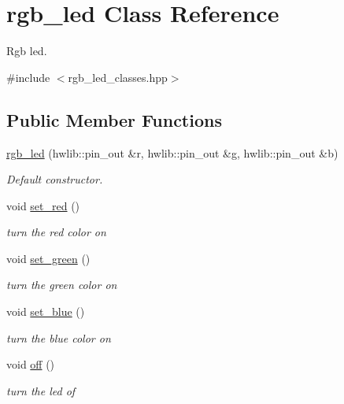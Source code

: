 \hypertarget{classrgb__led}{}\section{rgb\+\_\+led Class Reference}
\label{classrgb__led}


Rgb led.  




{\ttfamily \#include $<$rgb\+\_\+led\+\_\+classes.\+hpp$>$}

\subsection*{Public Member Functions}
\begin{DoxyCompactItemize}
\item 
\hyperlink{classrgb__led_ab8a4367c1d76a6274e65230524af0456}{rgb\+\_\+led} (hwlib\+::pin\+\_\+out \&r, hwlib\+::pin\+\_\+out \&g, hwlib\+::pin\+\_\+out \&b)
\begin{DoxyCompactList}\small\item\em Default constructor. \end{DoxyCompactList}\item 
void \hyperlink{classrgb__led_aaf7cc1181e7ddafbd199c669bd2bace1}{set\+\_\+red} ()
\begin{DoxyCompactList}\small\item\em turn the red color on \end{DoxyCompactList}\item 
void \hyperlink{classrgb__led_a1832619177bce8c5221e3495af1c081c}{set\+\_\+green} ()
\begin{DoxyCompactList}\small\item\em turn the green color on \end{DoxyCompactList}\item 
void \hyperlink{classrgb__led_acaebeada28c4603b975fe3e5f328cc8e}{set\+\_\+blue} ()
\begin{DoxyCompactList}\small\item\em turn the blue color on \end{DoxyCompactList}\item 
void \hyperlink{classrgb__led_ab22d036c95b9eaa96cd73ec33758a4f0}{off} ()
\begin{DoxyCompactList}\small\item\em turn the led of \end{DoxyCompactList}\end{DoxyCompactItemize}


